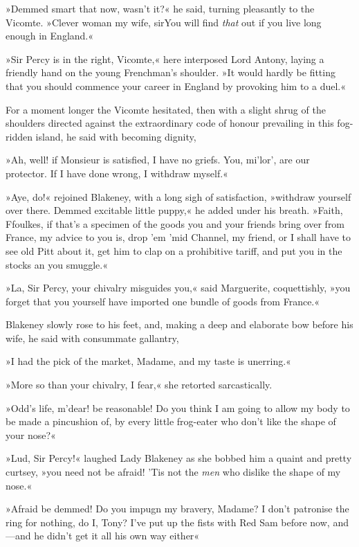 »Demmed smart that now, wasn't it?« he said, turning pleasantly to the Vicomte. »Clever woman my wife, sir\textellipsis \allowbreak  You will find \textit{that} out if you live long enough in England.«

»Sir Percy is in the right, Vicomte,« here interposed Lord Antony, laying a friendly hand on the young Frenchman's shoulder. »It would hardly be fitting that you should commence your career in England by provoking him to a duel.«

For a moment longer the Vicomte hesitated, then with a slight shrug of the shoulders directed against the extraordinary code of honour prevailing in this fog-ridden island, he said with becoming dignity,\longdash


»Ah, well! if Monsieur is satisfied, I have no griefs. You, mi'lor', are our protector. If I have done wrong, I withdraw myself.«

»Aye, do!« rejoined Blakeney, with a long sigh of satisfaction, »withdraw yourself over there. Demmed excitable little puppy,« he added under his breath. »Faith, Ffoulkes, if that's a specimen of the goods you and your friends bring over from France, my advice to you is, drop 'em 'mid Channel, my friend, or I shall have to see old Pitt about it, get him to clap on a prohibitive tariff, and put you in the stocks an you smuggle.«

»La, Sir Percy, your chivalry misguides you,« said Marguerite, coquettishly, »you forget that you yourself have imported one bundle of goods from France.«

Blakeney slowly rose to his feet, and, making a deep and elaborate bow before his wife, he said with consummate gallantry,\longdash


»I had the pick of the market, Madame, and my taste is unerring.«

»More so than your chivalry, I fear,« she retorted sarcastically.

»Odd's life, m'dear! be reasonable! Do you think I am going to allow my body to be made a pincushion of, by every little frog-eater who don't like the shape of your nose?«

»Lud, Sir Percy!« laughed Lady Blakeney as she bobbed him a quaint and pretty curtsey, »you need not be afraid! 'Tis not the \textit{men} who dislike the shape of my nose.«

»Afraid be demmed! Do you impugn my bravery, Madame? I don't patronise the ring for nothing, do I, Tony? I've put up the fists with Red Sam before now, and—and he didn't get it all his own way either\longdash«

